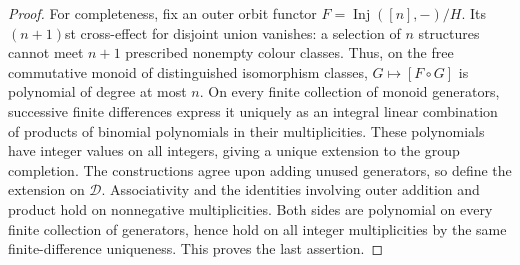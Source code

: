 \begin{proof}
For completeness, fix an outer orbit functor
$F=\operatorname{Inj}([n],-)/H$. Its $(n+1)$st cross-effect for disjoint
union vanishes: a selection of $n$ structures cannot meet $n+1$ prescribed
nonempty colour classes. Thus, on the free commutative monoid of
distinguished isomorphism classes, $G\mapsto[F\circ G]$ is polynomial of
degree at most $n$. On every finite collection of monoid generators,
successive finite differences express it uniquely as an integral linear
combination of products of binomial polynomials in their multiplicities.
These polynomials have integer values on all integers, giving a unique
extension to the group completion. The constructions agree upon adding
unused generators, so define the extension on $\mathcal D$.
Associativity and the identities involving outer addition and product hold
on nonnegative multiplicities. Both sides are polynomial on every finite
collection of generators, hence hold on all integer multiplicities by
the same finite-difference uniqueness. This proves the last assertion.
\end{proof}

